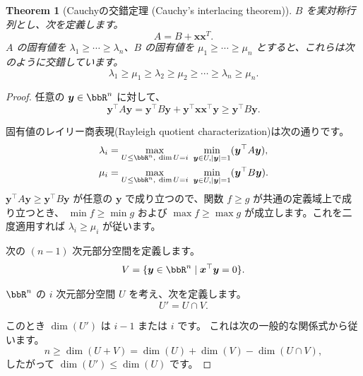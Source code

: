 \documentclass[a4paper, 10pt, dvipdfmx,draft]{article}
\newtheorem{theorem}{Theorem}
\begin{document}
\begin{theorem}[Cauchyの交錯定理 (Cauchy's interlacing theorem)]
    $B$ を実対称行列とし、次を定義します。
    \begin{equation*}
        A = B + \bm{x}\bm{x}^{T}.
    \end{equation*}
    $A$ の固有値を $\lambda_1 \ge \cdots \ge \lambda_n$、$B$ の固有値を $\mu_1 \ge \cdots \ge \mu_n$ とすると、これらは次のように交錯しています。
    \begin{equation*}
        \lambda_1 \ge \mu_1 \ge \lambda_2 \ge \mu_2 \ge \cdots \ge \lambda_n \ge \mu_n.
    \end{equation*}
\end{theorem}
\begin{proof}
    任意の $\bm{y} \in \bbR^n$ に対して、
    \begin{equation*}
        \bm{y}^\top A \bm{y} = \bm{y}^\top B \bm{y} + \bm{y}^\top \bm{x} \bm{x}^\top \bm{y}
        \geq \bm{y}^\top B \bm{y}.
    \end{equation*}

    固有値のレイリー商表現(Rayleigh quotient characterization)は次の通りです。
    \begin{align*}
        \lambda_i & = \max_{U \le \bbR^n,\ \dim U = i} \ \min_{\bm{y} \in U, |\bm{y}| = 1} (\bm{y}^\top A \bm{y}), \\
        \mu_i     & = \max_{U \le \bbR^n,\ \dim U = i} \ \min_{\bm{y} \in U, |\bm{y}| = 1} (\bm{y}^\top B \bm{y}).
    \end{align*}
    $\bm{y}^\top A \bm{y} \ge \bm{y}^\top B \bm{y}$ が任意の $\bm{y}$ で成り立つので、関数 $f \ge g$ が共通の定義域上で成り立つとき、
    $\min f \ge \min g$ および $\max f \ge \max g$ が成立します。これを二度適用すれば $\lambda_i \ge \mu_i$ が従います。

    次の $(n-1)$ 次元部分空間を定義します。
    \begin{equation*}
        V = \{\bm{y} \in \bbR^n \mid \bm{x}^\top \bm{y} = 0\}.
    \end{equation*}

    $\bbR^n$ の $i$ 次元部分空間 $U$ を考え、次を定義します。
    \begin{equation*}
        U' = U \cap V.
    \end{equation*}

    このとき $\dim(U')$ は $i-1$ または $i$ です。
    これは次の一般的な関係式から従います。
    \begin{equation*}
        n \ge \dim(U + V) = \dim(U) + \dim(V) - \dim(U \cap V),
    \end{equation*}
    したがって $\dim(U') \le \dim(U)$ です。


\end{proof}
\end{document}
